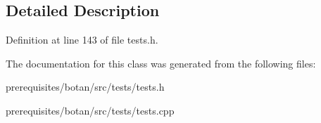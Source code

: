 \subsection{Detailed Description}


Definition at line 143 of file tests.\+h.



The documentation for this class was generated from the following files\+:\begin{DoxyCompactItemize}
\item 
prerequisites/botan/src/tests/tests.\+h\item 
prerequisites/botan/src/tests/tests.\+cpp\end{DoxyCompactItemize}
